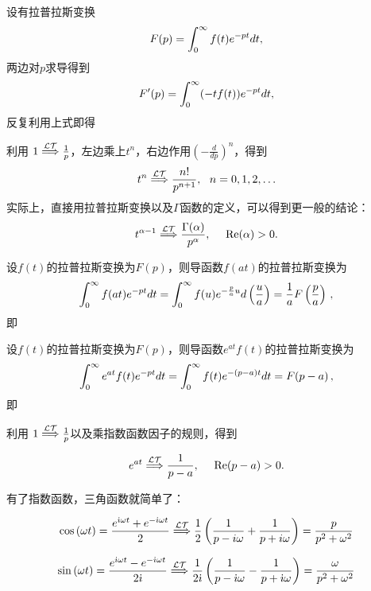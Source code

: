 \documentclass[CJK]{beamer}
\begin{document}
\begin{frame}
\bch
设有拉普拉斯变换
$$ F(p) = \int_0^\infty f(t) e^{-pt} dt, $$
两边对$p$求导得到
$$ F'(p) = \int_0^\infty (-tf(t)) e^{-pt} dt, $$
反复利用上式即得
\ech
\end{frame}


\begin{frame}
  \bch
  利用 $1 \stackrel{\mathcal{LT}}{\Longrightarrow} \frac{1}{p} $，左边乘上$t^n$，右边作用$\left(-\frac{d}{dp}\right)^n$，得到
   $$ t^n \ltf \frac{n!}{p^{n+1}},\ \ n=0,1,2,\ldots $$
  实际上，直接用拉普拉斯变换以及$\Gamma$函数的定义，可以得到更一般的结论：
  {\blue  $$ t^{\alpha-1} \stackrel{\mathcal{LT}}{\Longrightarrow} \frac{\Gamma(\alpha)}{p^{\alpha}},\ \ \ \ \mathrm{Re}(\alpha) >  0.$$}
  
  \ech
\end{frame}

\begin{frame}
\bch
设$f(t)$的拉普拉斯变换为$F(p)$，则导函数$f(at)$的拉普拉斯变换为
$$\int_0^\infty f(at) e^{-pt} dt =  \int_0^\infty f(u) e^{-\frac{p}{a}u} d\left(\frac{u}{a}\right) = \frac{1}{a}F\left(\frac{p}{a}\right)\,,$$
即
\ech
\end{frame}

\begin{frame}
\bch
设$f(t)$的拉普拉斯变换为$F(p)$，则导函数$e^{at}f(t)$的拉普拉斯变换为
$$\int_0^\infty e^{at}f(t) e^{-pt} dt  = \int_0^\infty f(t) e^{-(p-a)t} dt  = F(p-a)\,,$$
即
\ech
\end{frame}

\begin{frame}
  \bch
  利用 $1 \stackrel{\mathcal{LT}}{\Longrightarrow} \frac{1}{p} $以及乘指数函数因子的规则，得到

  {\blue  $$ e^{at} \ltf \frac{1}{p-a},\ \ \ \ \mathrm{Re}(p-a)>0.$$}
  \ech
\end{frame}


\begin{frame}
  \bch
  有了指数函数，三角函数就简单了：{\blue
  $$ \cos{(\omega t)} = \frac{e^{{\dot{\imath}} \omega t}+e^{-{\dot{\imath}} \omega t}}{2}  \stackrel{\mathcal{LT}}{\Longrightarrow} \frac{1}{2}\left(\frac{1}{p-i\omega} +  \frac{1}{p+i\omega}\right) = \frac{p}{p^2+\omega^2} $$

  $$ \sin{(\omega t)} = \frac{e^{{\dot{\imath}} \omega t}-e^{-{\dot{\imath}} \omega t}}{2{\dot{\imath}}}  \stackrel{\mathcal{LT}}{\Longrightarrow} \frac{1}{2{\dot{\imath}}}\left(\frac{1}{p-{\dot{\imath}}\omega} - \frac{1}{p+{\dot{\imath}}\omega}\right) = \frac{\omega}{p^2+\omega^2} $$}
  \ech
\end{frame}
\end{document}
